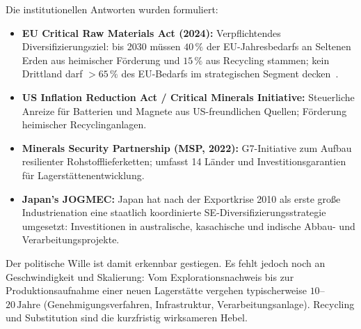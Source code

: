 ﻿\documentclass[12pt, a4paper]{report}
\theoremstyle{definition}
\theoremstyle{remark}
\begin{document}
Die institutionellen Antworten wurden formuliert:
\begin{itemize}
  \item \textbf{EU Critical Raw Materials Act (2024):} Verpflichtendes
        Diversifizierungsziel: bis 2030 müssen $40\,\%$ der EU-Jahresbedarfs
        an Seltenen Erden aus heimischer Förderung und $15\,\%$ aus Recycling
        stammen; kein Drittland darf $>65\,\%$ des EU-Bedarfs im strategischen
        Segment decken~\cite{eu2023}.
  \item \textbf{US Inflation Reduction Act / Critical Minerals Initiative:}
        Steuerliche Anreize für Batterien und Magnete aus US-freundlichen
        Quellen; Förderung heimischer Recyclinganlagen.
  \item \textbf{Minerals Security Partnership (MSP, 2022):} G7-Initiative
        zum Aufbau resilienter Rohstofflieferketten; umfasst 14 Länder
        und Investitionsgarantien für Lagerstättenentwicklung.
  \item \textbf{Japan's JOGMEC:} Japan hat nach der Exportkrise 2010 als
        erste große Industrienation eine staatlich koordinierte
        SE-Diversifizierungsstrategie umgesetzt: Investitionen in
        australische, kasachische und indische Abbau- und
        Verarbeitungsprojekte.
\end{itemize}

Der politische Wille ist damit erkennbar gestiegen. Es fehlt jedoch noch an
Geschwindigkeit und Skalierung: Vom Explorationsnachweis bis zur
Produktionsaufnahme einer neuen Lagerstätte vergehen typischerweise
$10$--$20\,\text{Jahre}$ (Genehmigungsverfahren, Infrastruktur,
Verarbeitungsanlage). Recycling und Substitution sind die kurzfristig
wirksameren Hebel.
\end{document}
